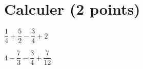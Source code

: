 \section{Calculer (2 points)}


\begin{questions}
	\question[1] $\dfrac{1}{4} + \dfrac{5}{2} - \dfrac{3}{4} + 2$
	
	\question[1] $4 - \dfrac{7}{3} - \dfrac{3}{4} + \dfrac{7}{12}$
\end{questions}

